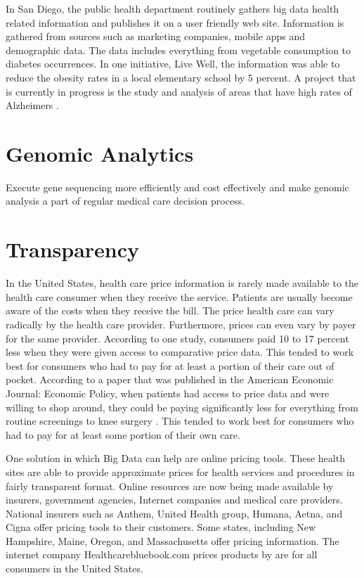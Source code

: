 \documentclass[sigconf]{acmart}
\begin{document}
In San Diego, the public health department routinely gathers big data health related information and publishes it on a user friendly web site. Information is gathered from sources such as marketing companies, mobile apps and demographic data.  The data includes everything from vegetable consumption to diabetes occurrences.  In one initiative, Live Well, the information was able to reduce the obesity rates in a local elementary school by 5 percent. A project that is currently in progress is the study and analysis of areas that have high rates of Alzheimers \cite{www-google-sandiego}.   

\section{Genomic Analytics}
Execute gene sequencing more efficiently and cost effectively and make genomic analysis a part of regular medical care decision process. 

\section{Transparency}
In the United States, health care price information is rarely made available to the health care consumer when they receive the service. Patients are usually become aware of the costs when they receive the bill. The price health care can vary radically by the health care provider. Furthermore, prices can even vary by payer for the same provider.  According to one study, consumers paid 10 to 17 percent less when they were given access to comparative price data.  This tended to work best for consumers who had to pay for at least a portion of their care out of pocket. According to a paper that was published in the American Economic Journal: Economic Policy, when patients had access to price data and were willing to shop around, they could be paying significantly less for everything from routine screenings to knee surgery \cite{www-google-transparent}.  This tended to work best for consumers who had to pay for at least some portion of their own care. 

One solution in which Big Data can help are online pricing tools. These health sites are able to provide approximate prices for health services and procedures in fairly transparent format. Online resources are now being made available by insurers, government agencies, Internet companies and medical care providers. National insurers such as Anthem, United Health group, Humana, Aetna, and Cigna offer pricing tools to their customers. Some states, including New Hampshire, Maine, Oregon, and Massachusetts offer pricing information. The internet company Healthcarebluebook.com prices products by are for all consumers in the United States. 
\end{document}
